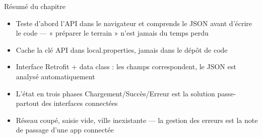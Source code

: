 \begin{tcbsummary}{Résumé du chapitre}
\begin{itemize}
  \item Teste d’abord l’API dans le navigateur et comprends le JSON avant d’écrire le code — « préparer le terrain » n’est jamais du temps perdu
  \item Cache la clé API dans local.properties, jamais dans le dépôt de code
  \item Interface Retrofit + data class : les champs correspondent, le JSON est analysé automatiquement
  \item L’état en trois phases Chargement/Succès/Erreur est la solution passe-partout des interfaces connectées
  \item Réseau coupé, saisie vide, ville inexistante — la gestion des erreurs est la note de passage d’une app connectée
\end{itemize}

\end{tcbsummary}
